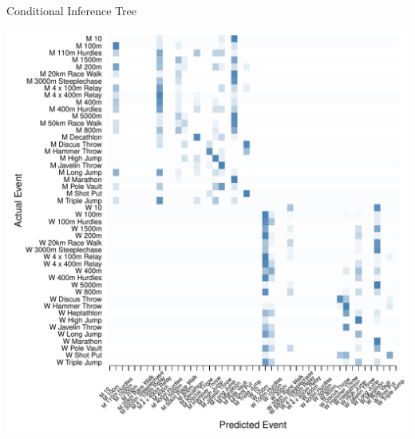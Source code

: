 \documentclass[landscape, paperwidth=42in, paperheight=36in,
fontscale=.35, margin=1in]{baposter}
\begin{document}
\begin{poster}
{\begin{center}
\begin{minipage}{0.45\textwidth}
\begin{center}
    \end{center}
  \end{minipage}
  Conditional Inference Tree \\


  \begin{minipage}{0.45\textwidth}
    \begin{center}
      \includegraphics[scale=0.27]{../graphics/athletesEV-trn.pdf}
    \end{center}
  \end{minipage}
  \hspace{0.05\textwidth}
  \begin{minipage}{0.45\textwidth}
    \begin{center}

\end{center}
\end{minipage}
\end{center}}
\end{poster}
\end{document}
